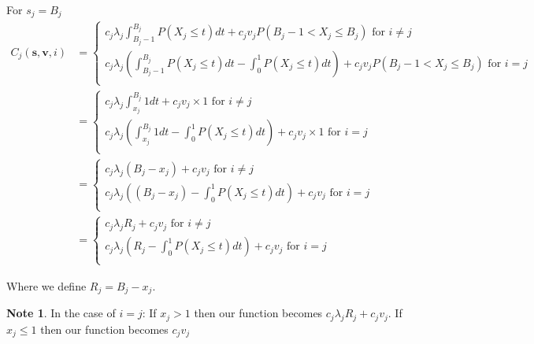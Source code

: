 \documentclass[a4paper,10pt]{article}
\theoremstyle{definition}
\theoremstyle{definition}
\theoremstyle{remark}
\theoremstyle{definition}
\newtheorem*{note}{Note}
\begin{document}
For $s_{j}=B_{j}$
\begin{align*}
C_{j}(\bm{s},\bm{v},i)&=\begin{cases}
c_{j} \lambda_{j} \int_{B_{j}-1}^{B_{j}} P(X_{j} \leq t) dt + c_{j} v_{j} P(B_{j}-1 < X_{j} \leq B_{j}) \text{ for } i \neq j \\
c_{j} \lambda_{j} (\int_{B_{j}-1}^{B_{j}} P(X_{j} \leq t) dt - \int_{0}^{1} P(X_{j} \leq t) dt) + c_{j} v_{j} P(B_{j}-1 < X_{j} \leq B_{j}) \text{ for } i=j \\
\end{cases} \\
&=\begin{cases}
c_{j} \lambda_{j} \int_{x_{j}}^{B_{j}} 1 dt + c_{j} v_{j} \times 1 \text{ for } i \neq j \\
c_{j} \lambda_{j} (\int_{x_{j}}^{B_{j}} 1 dt - \int_{0}^{1} P(X_{j} \leq t) dt) + c_{j} v_{j} \times 1 \text{ for } i=j \\
\end{cases} \\
&=\begin{cases}
c_{j} \lambda_{j} (B_{j}-x_{j}) + c_{j} v_{j}  \text{ for } i \neq j \\
c_{j} \lambda_{j} ((B_{j}-x_{j}) - \int_{0}^{1} P(X_{j} \leq t) dt) + c_{j} v_{j} \text{ for } i=j \\
\end{cases} \\
&=\begin{cases}
c_{j} \lambda_{j} R_{j} + c_{j} v_{j}  \text{ for } i \neq j \\
c_{j} \lambda_{j} (R_{j} - \int_{0}^{1} P(X_{j} \leq t) dt) + c_{j} v_{j} \text{ for } i=j \\
\end{cases}  
\end{align*}

Where we define $R_{j}=B_{j}-x_{j}$.

\begin{note}
In the case of $i=j$: 
If $x_{j} > 1$ then our function becomes $c_{j} \lambda_{j} R_{j} + c_{j} v_{j}$.
If $x_{j} \leq 1$ then our function becomes $c_{j} v_{j}$
\end{note}
\end{document}
